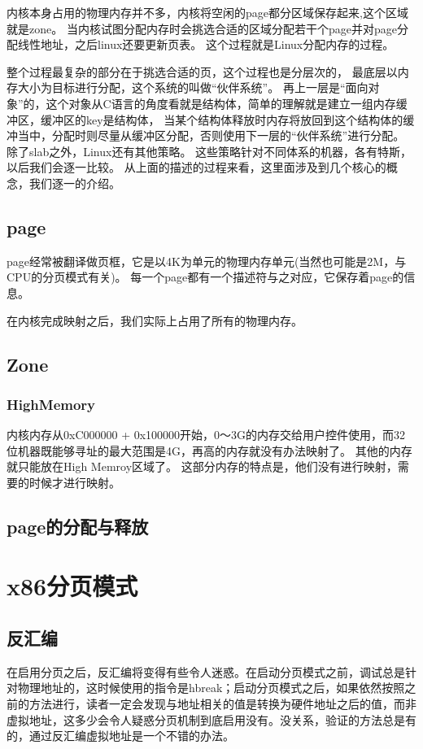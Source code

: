 内核本身占用的物理内存并不多，内核将空闲的page都分区域保存起来,这个区域就是zone。
当内核试图分配内存时会挑选合适的区域分配若干个page并对page分配线性地址，之后linux还要更新页表。
这个过程就是Linux分配内存的过程。


整个过程最复杂的部分在于挑选合适的页，这个过程也是分层次的， 最底层以内存大小为目标进行分配，这个系统的叫做“伙伴系统”。
再上一层是“面向对象”的，这个对象从C语言的角度看就是结构体，简单的理解就是建立一组内存缓冲区，缓冲区的key是结构体， 当某个结构体释放时内存将放回到这个结构体的缓冲当中，分配时则尽量从缓冲区分配，否则使用下一层的“伙伴系统”进行分配。
除了slab之外，Linux还有其他策略。
这些策略针对不同体系的机器，各有特斯，以后我们会逐一比较。
从上面的描述的过程来看，这里面涉及到几个核心的概念，我们逐一的介绍。

\subsection{page}
page经常被翻译做页框，它是以4K为单元的物理内存单元(当然也可能是2M，与CPU的分页模式有关)。
每一个page都有一个描述符与之对应，它保存着page的信息。


在内核完成映射之后，我们实际上占用了所有的物理内存。
\subsection{Zone}

\subsubsection{HighMemory}
内核内存从0xC000000 + 0x100000开始，0～3G的内存交给用户控件使用，而32位机器既能够寻址的最大范围是4G，再高的内存就没有办法映射了。
其他的内存就只能放在High Memroy区域了。
这部分内存的特点是，他们没有进行映射，需要的时候才进行映射。

\subsection{page的分配与释放}

\section{x86分页模式}

\subsection{反汇编}
在启用分页之后，反汇编将变得有些令人迷惑。在启动分页模式之前，调试总是针对物理地址的，这时候使用的指令是hbreak；启动分页模式之后，如果依然按照之前的方法进行，读者一定会发现与地址相关的值是转换为硬件地址之后的值，而非虚拟地址，这多少会令人疑惑分页机制到底启用没有。没关系，验证的方法总是有的，通过反汇编虚拟地址是一个不错的办法。

